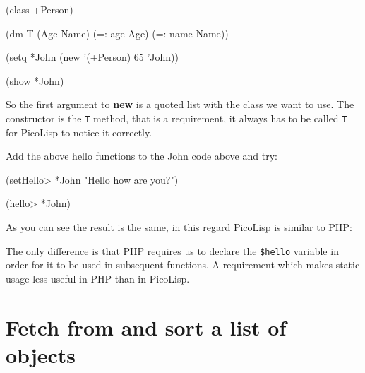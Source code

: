 \begin{wideverbatim}
(class +Person)

(dm T (Age Name)
    (=: age Age)
    (=: name Name))

(setq *John (new '(+Person) 65 'John))

(show *John)
\end{wideverbatim}

So the first argument to \textbf{new} is a quoted list with the class
we want to use. The constructor is the \texttt{T} method, that is a
requirement, it always has to be called \texttt{T} for PicoLisp to
notice it correctly.

Add the above hello functions to the John code above and try:

\begin{wideverbatim}
(setHello> *John "Hello how are you?")

(hello> *John)
\end{wideverbatim}

As you can see the result is the same, in this regard PicoLisp is similar to
PHP:



The only difference is that PHP requires us to declare the
\texttt{\$hello} variable in order for it to be used in subsequent
functions. A requirement which makes static usage less useful in PHP
than in PicoLisp.

\section{Fetch from and sort a list of objects}
\label{sec:simple-oo-fetch-from-and-sort-a-list-of-objects}


